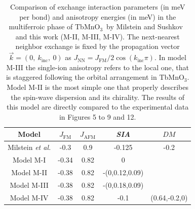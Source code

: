 \documentclass[aps,prb,twocolumn,superscriptaddress,showpacs,floatfix]{revtex4-2}
\newcommand{\tbmno}{TbMnO$_3$}
\newcommand{\etal}{\textit{et al.}}
\begin{document}
\begin{table}
	\begin{ruledtabular}
		\begin{tabular}{c c c c c}
			Model 							& $J_{\textrm{FM}}$   & $J_{\textrm{AFM}}$  & \textit{SIA}  & $DM$ \\
			\hline
			Milstein \etal     				& -0.3     				& 0.9     				& -0.125   			& -0.2 \\ %
			Model M-I   					& -0.34    				& 0.82    				& 0	& \\
			Model M-II   					& -0.38    				& 0.82    				& -(0,0.12,0.09) 	& \\
			Model M-III   					& -0.38    				& 0.82    				& -(0,0.18,0.09) 	&  \\
			Model M-IV   					& -0.38    				& 0.82    				& -0.1    			& (0.64,-0.2,0) \\ %
		\end{tabular}
	\end{ruledtabular}
	\caption{Comparison of exchange interaction parameters (in meV per bond) and anisotropy energies (in meV) in the multiferroic phase of \tbmno\ by Milstein and Sushkov~\cite{Milstein2015} and this work (M-II, M-III, M-IV). The next-nearest neighbor exchange is fixed by the propagation vector $\vec{k}=(0,~k_{\textrm{inc}},~0)$ as $J_{\textrm{NN}}=J_{\textrm{FM}}/2\cos(k_{\textrm{inc}}\pi)$. 
		In model M-III the single-ion anisotropy refers to the local one, that is staggered following the 
		orbital arrangement in TbMnO$_3$. Model M-II is the most simple one that properly describes the
		spin-wave dispersion and its chirality. The results of this model are directly compared to the experimental data in Figures 5 to 9 and 12.
	}
	\label{tab:tbmno-spinWfit}
\end{table}
\end{document}
